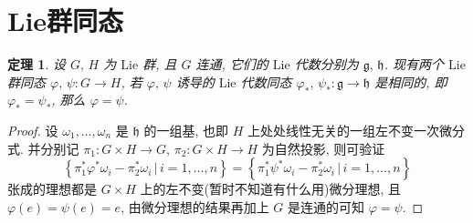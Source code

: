\documentclass{book}
\newtheorem{theorem}{\indent 定理}[section]
\begin{document}
    \section{Lie群同态}
        \begin{theorem}
            设 $G,\,H$ 为 $\mathrm{Lie}$ 群, 且 $G$ 连通, 它们的 $\mathrm{Lie}$ 代数分别为 $\mathfrak{g,\,h}$. 现有两个 $\mathrm{Lie}$ 群同态 $\varphi,\,\psi:G\rightarrow H$, 
            若 $\varphi,\,\psi$ 诱导的 $\mathrm{Lie}$ 代数同态 $\varphi_*,\,\psi_*:\mathfrak{g}\rightarrow\mathfrak{h}$ 是相同的, 即 $\varphi_*=\psi_*$, 那么 $\varphi=\psi$.
        \end{theorem}
        \begin{proof}
            设 $\omega_1,\dots,\omega_n$ 是 $\mathfrak{h}$ 的一组基, 也即 $H$ 上处处线性无关的一组左不变一次微分式.
            并分别记 $\pi_1:G\times H\rightarrow G$, $\pi_2:G\times H\rightarrow H$ 为自然投影, 则可验证
            \begin{equation*}
                \left\{\pi_1^*\varphi^*\omega_i-\pi_2^*\omega_i\,\Big|\,i=1,\dots,n\right\} = \left\{\pi_1^*\psi^*\omega_i-\pi_2^*\omega_i\,\Big|\,i=1,\dots,n\right\}
            \end{equation*}
            张成的理想都是 $G\times H$ 上的左不变(暂时不知道有什么用)微分理想, 且 $\varphi(e) = \psi(e) = e$, 由微分理想的结果再加上 $G$ 是连通的可知 $\varphi = \psi$.
        \end{proof}
\end{document}
